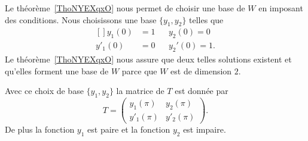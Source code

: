 Le théorème~\ref{ThoNYEXqxO} nous permet de choisir une base de \( W\) en imposant des conditions. Nous choisissons une base \( \{ y_1,y_2 \}\) telles que
\begin{equation}
	\begin{aligned}[]
		y_1(0)  & =1 &  & y_2(0)=0   \\
		y'_1(0) & =0 &  & y_2'(0)=1.
	\end{aligned}
\end{equation}
Le théorème~\ref{ThoNYEXqxO} nous assure que deux telles solutions existent et qu'elles forment une base de \( W\) parce que \( W\) est de dimension \( 2\).

\begin{lemma}   \label{IVLzNaU}
	Avec ce choix de base \( \{ y_1,y_2 \}\) la matrice de \( T\) est donnée par
	\begin{equation}
		T=\begin{pmatrix}
			y_1(\pi)  & y_2(\pi)  \\
			y'_1(\pi) & y'_2(\pi)
		\end{pmatrix}.
	\end{equation}
	De plus la fonction \( y_1\) est paire et la fonction \( y_2\) est impaire.
\end{lemma}

